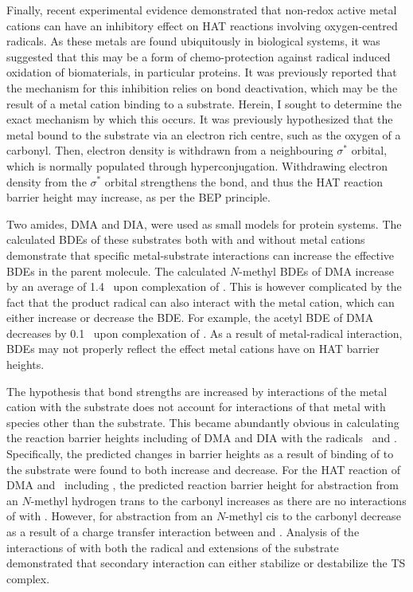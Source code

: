 \begin{doublespace}
Finally, recent experimental evidence demonstrated that non-redox active metal
cations can have an inhibitory effect on HAT reactions involving oxygen-centred
radicals. As these metals are found ubiquitously in biological systems, it was
suggested that this may be a form of chemo-protection against radical induced
oxidation of biomaterials, in particular proteins. It was previously reported
that the mechanism for this inhibition relies on  bond deactivation,
which may be the result of a metal cation binding to a substrate. Herein, I
sought to determine the exact mechanism by which this occurs. It was previously
hypothesized that the metal bound to the substrate via an electron rich centre,
such as the oxygen of a carbonyl. Then, electron density is withdrawn from a
neighbouring  $\sigma^*$ orbital, which is normally populated through
hyperconjugation. Withdrawing electron density from the  $\sigma^*$
orbital strengthens the bond, and thus the HAT reaction barrier height may
increase, as per the BEP principle.

Two amides, DMA and DIA, were used as small models for protein systems. The
calculated  BDEs of these substrates both with and without metal cations
demonstrate that specific metal-substrate interactions can increase the
effective  BDEs in the parent molecule. The calculated $N$-methyl
 BDEs of DMA increase by an average of 1.4 \kcalmol\ upon complexation
of . This is however complicated by the fact that the product radical
can also interact with the metal cation, which can either increase or decrease
the BDE. For example, the acetyl  BDE of DMA decreases by 0.1 \kcalmol\
upon complexation of . As a result of metal-radical interaction, BDEs
may not properly reflect the effect metal cations have on HAT barrier heights.

The hypothesis that  bond strengths are increased by interactions of the
metal cation with the substrate does not account for interactions of that metal
with species other than the substrate. This became abundantly obvious in
calculating the reaction barrier heights including  of DMA and DIA with
the radicals \cumo\ and \bno. Specifically, the predicted changes in barrier
heights as a result of binding of  to the substrate were found to both
increase and decrease. For the HAT reaction of DMA and \cumo\ including
\ch{NaCl}, the predicted reaction barrier height for abstraction from an
$N$-methyl hydrogen trans to the carbonyl increases as there are no interactions
of \ch{NaCl} with \cumo. However, for abstraction from an $N$-methyl cis to the
carbonyl decrease as a result of a charge transfer interaction between 
and \cumo. Analysis of the interactions of \ch{NaCl} with both the radical and
extensions of the substrate demonstrated that secondary interaction can either
stabilize or destabilize the TS complex.


\end{doublespace}
